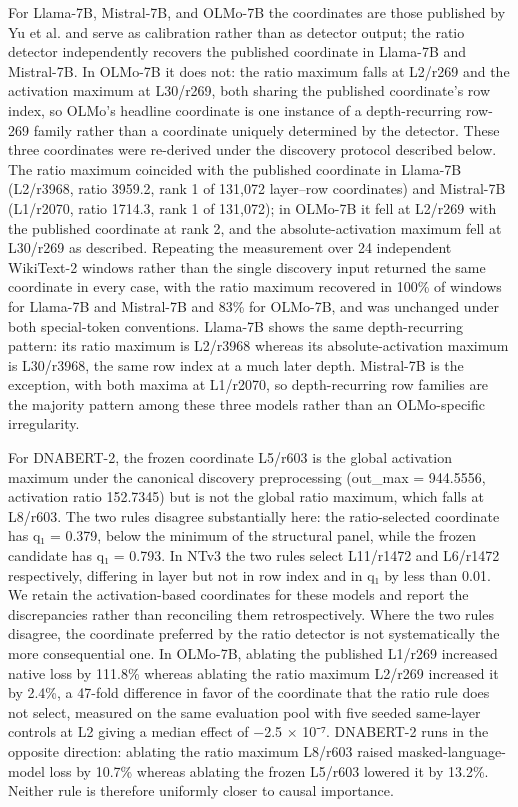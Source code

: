 \documentclass[11pt]{article}
\begin{document}
For Llama-7B, Mistral-7B, and OLMo-7B the coordinates are those published by Yu et al. and serve as calibration rather than as detector output; the ratio detector independently recovers the published coordinate in Llama-7B and Mistral-7B. In OLMo-7B it does not: the ratio maximum falls at L2/r269 and the activation maximum at L30/r269, both sharing the published coordinate’s row index, so OLMo’s headline coordinate is one instance of a depth-recurring row-269 family rather than a coordinate uniquely determined by the detector. These three coordinates were re-derived under the discovery protocol described below. The ratio maximum coincided with the published coordinate in Llama-7B (L2/r3968, ratio 3959.2, rank 1 of 131,072 layer–row coordinates) and Mistral-7B (L1/r2070, ratio 1714.3, rank 1 of 131,072); in OLMo-7B it fell at L2/r269 with the published coordinate at rank 2, and the absolute-activation maximum fell at L30/r269 as described. Repeating the measurement over 24 independent WikiText-2 windows rather than the single discovery input returned the same coordinate in every case, with the ratio maximum recovered in 100\% of windows for Llama-7B and Mistral-7B and 83\% for OLMo-7B, and was unchanged under both special-token conventions. Llama-7B shows the same depth-recurring pattern: its ratio maximum is L2/r3968 whereas its absolute-activation maximum is L30/r3968, the same row index at a much later depth. Mistral-7B is the exception, with both maxima at L1/r2070, so depth-recurring row families are the majority pattern among these three models rather than an OLMo-specific irregularity.

For DNABERT-2, the frozen coordinate L5/r603 is the global activation maximum under the canonical discovery preprocessing (out\_max = 944.5556, activation ratio 152.7345) but is not the global ratio maximum, which falls at L8/r603. The two rules disagree substantially here: the ratio-selected coordinate has q₁ = 0.379, below the minimum of the structural panel, while the frozen candidate has q₁ = 0.793. In NTv3 the two rules select L11/r1472 and L6/r1472 respectively, differing in layer but not in row index and in q₁ by less than 0.01. We retain the activation-based coordinates for these models and report the discrepancies rather than reconciling them retrospectively. Where the two rules disagree, the coordinate preferred by the ratio detector is not systematically the more consequential one. In OLMo-7B, ablating the published L1/r269 increased native loss by 111.8\% whereas ablating the ratio maximum L2/r269 increased it by 2.4\%, a 47-fold difference in favor of the coordinate that the ratio rule does not select, measured on the same evaluation pool with five seeded same-layer controls at L2 giving a median effect of −2.5 × 10⁻⁷. DNABERT-2 runs in the opposite direction: ablating the ratio maximum L8/r603 raised masked-language-model loss by 10.7\% whereas ablating the frozen L5/r603 lowered it by 13.2\%. Neither rule is therefore uniformly closer to causal importance.
\end{document}
